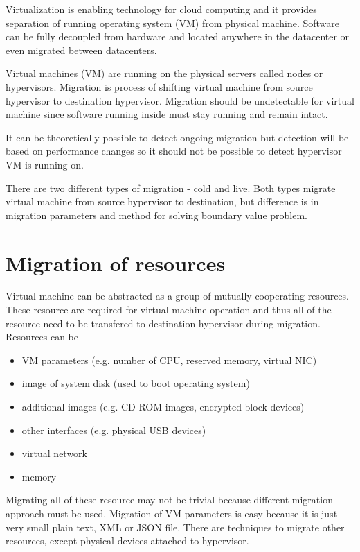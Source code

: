 


Virtualization is enabling technology for cloud computing and it provides separation of running operating system (\Ac{VM}) from physical machine. Software can be fully decoupled from hardware and located anywhere in the datacenter or even migrated between datacenters. 

Virtual machines (\Ac{VM}) are running on the physical servers called nodes or hypervisors. Migration is process of shifting virtual machine from source hypervisor to destination hypervisor. Migration should be undetectable for virtual machine since software running inside must stay running and remain intact. 

It can be theoretically possible to detect ongoing migration but detection will be based on performance changes so it should not be possible to detect hypervisor \Ac{VM} is running on.


There are two different types of migration - cold and live. Both types migrate virtual machine from source hypervisor to destination, but difference is in migration parameters and method for solving boundary value problem.

\section{Migration of resources}
Virtual machine can be abstracted as a group of mutually cooperating resources. These resource are required for virtual machine operation and thus all of the resource need to be transfered to destination hypervisor during migration. Resources can be
\begin{itemize}
	\item \Ac{VM} parameters (e.g. number of \Ac{CPU}, reserved memory, virtual \Ac{NIC})
	\item image of system disk (used to boot operating system)
	\item additional images (e.g. CD-ROM images, encrypted block devices)
	\item other interfaces (e.g. physical \Ac{USB} devices)
	\item virtual network
	\item memory
\end{itemize}
Migrating all of these resource may not be trivial because different migration approach must be used. Migration of \Ac{VM} parameters is easy because it is just very small plain text, \Ac{XML} or \Ac{JSON} file. There are techniques to migrate other resources, except physical devices attached to hypervisor.

